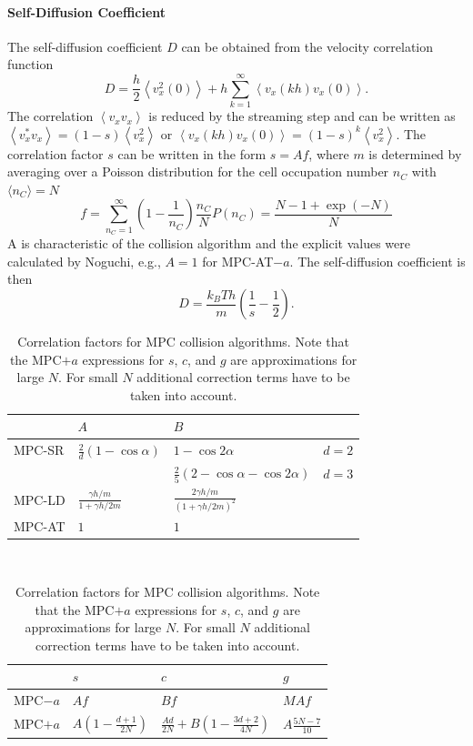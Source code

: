 \documentclass[8.5pt,twoside,twocolumn]{article}
\begin{document}
\paragraph{Self-Diffusion Coefficient}

The self-diffusion coefficient $D$ can be obtained from  the velocity correlation function
%
\begin{equation}
D= \frac{h}{2} \left\langle v_x^2(0) \right\rangle + h \sum_{k=1}^{\infty} \left\langle v_x(kh) v_x(0) \right\rangle .
\end{equation}
%
The correlation $\left\langle v_x v_x \right\rangle$ is reduced by the streaming step and can be written as $\left\langle v_x^* v_x \right\rangle = (1-s) \left\langle v_x^2 \right\rangle$ or $\left\langle v_x(kh) v_x(0) \right\rangle=(1-s)^k \left\langle v_x^2 \right\rangle$. The correlation factor $s$ can be written in the form $s=Af$, where $m$ is determined by averaging over a Poisson distribution for the cell occupation number $n_C$ with $\langle n_C \rangle = N$
%
\begin{equation}
  f = \sum_{n_C=1}^{\infty} \left(1-\frac{1}{n_C}\right) \frac{n_C}{N} P(n_C) = \frac{N-1+\exp(-N)}{N}
\end{equation}
%
A is characteristic of the collision algorithm and the explicit values were calculated by Noguchi\cite{Noguchi:2008}, e.g., $A=1$ for MPC-AT$-a$. The self-diffusion coefficient is then
%
\begin{equation}
  D %
  = \frac{k_B T h}{m} \left( \frac{1}{s} - \frac{1}{2} \right) .
\end{equation}

\begin{table}\centering
\begin{tabular}{l|l|l|l}
  \hline
  & $A$ & $B$ \\
  \hline
  MPC-SR & $\frac{2}{d}(1-\cos\alpha)$ & $1-\cos2\alpha$ & $d=2$ \\
  & & $\frac{2}{5}(2-\cos\alpha-\cos2\alpha)$ & $d=3$ \\
  MPC-LD & $\frac{\gamma h/m}{1+\gamma h/2m}$ & $\frac{2\gamma h/m}{(1+\gamma h/2m)^2}$ \\
  MPC-AT & $1$ & $1$ \\
  \hline
\end{tabular}
\vspace*{\baselineskip}\\
\begin{tabular}{llll}
\hline
  & $s$ & $c$ & $g$ \\
\hline
  MPC$-a$ & $Af$ & $Bf$ & $MAf$ \\
  MPC$+a$ & $A\left(1-\frac{d+1}{2N}\right)$ & $\frac{Ad}{2N}+B\left(1-\frac{3d+2}{4N}\right)$ & $A\frac{5N-7}{10}$ \\
\hline
\end{tabular}
\caption{Correlation factors for MPC collision algorithms. Note that the MPC$+a$ expressions for $s$, $c$, and $g$ are approximations for large $N$. For small $N$ additional correction terms have to be taken into account.\cite{Noguchi:2008}}
\label{tab:mpc-correlation-factors}
\end{table}
\end{document}
